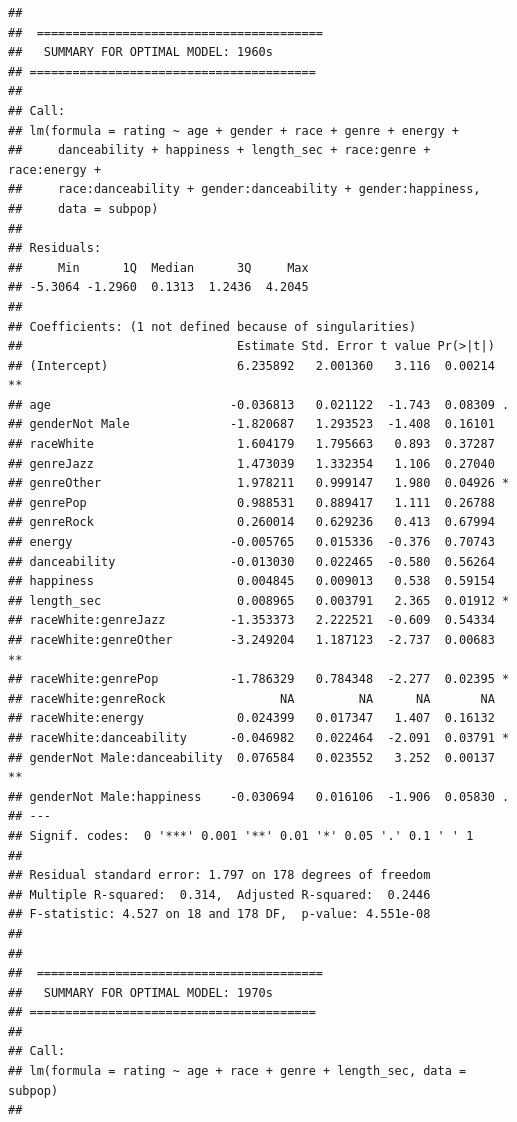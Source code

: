 \documentclass[
]{article}
\begin{document}
\begin{verbatim}
## 
##  ======================================== 
##   SUMMARY FOR OPTIMAL MODEL: 1960s 
## ======================================== 
## 
## Call:
## lm(formula = rating ~ age + gender + race + genre + energy + 
##     danceability + happiness + length_sec + race:genre + race:energy + 
##     race:danceability + gender:danceability + gender:happiness, 
##     data = subpop)
## 
## Residuals:
##     Min      1Q  Median      3Q     Max 
## -5.3064 -1.2960  0.1313  1.2436  4.2045 
## 
## Coefficients: (1 not defined because of singularities)
##                              Estimate Std. Error t value Pr(>|t|)   
## (Intercept)                  6.235892   2.001360   3.116  0.00214 **
## age                         -0.036813   0.021122  -1.743  0.08309 . 
## genderNot Male              -1.820687   1.293523  -1.408  0.16101   
## raceWhite                    1.604179   1.795663   0.893  0.37287   
## genreJazz                    1.473039   1.332354   1.106  0.27040   
## genreOther                   1.978211   0.999147   1.980  0.04926 * 
## genrePop                     0.988531   0.889417   1.111  0.26788   
## genreRock                    0.260014   0.629236   0.413  0.67994   
## energy                      -0.005765   0.015336  -0.376  0.70743   
## danceability                -0.013030   0.022465  -0.580  0.56264   
## happiness                    0.004845   0.009013   0.538  0.59154   
## length_sec                   0.008965   0.003791   2.365  0.01912 * 
## raceWhite:genreJazz         -1.353373   2.222521  -0.609  0.54334   
## raceWhite:genreOther        -3.249204   1.187123  -2.737  0.00683 **
## raceWhite:genrePop          -1.786329   0.784348  -2.277  0.02395 * 
## raceWhite:genreRock                NA         NA      NA       NA   
## raceWhite:energy             0.024399   0.017347   1.407  0.16132   
## raceWhite:danceability      -0.046982   0.022464  -2.091  0.03791 * 
## genderNot Male:danceability  0.076584   0.023552   3.252  0.00137 **
## genderNot Male:happiness    -0.030694   0.016106  -1.906  0.05830 . 
## ---
## Signif. codes:  0 '***' 0.001 '**' 0.01 '*' 0.05 '.' 0.1 ' ' 1
## 
## Residual standard error: 1.797 on 178 degrees of freedom
## Multiple R-squared:  0.314,  Adjusted R-squared:  0.2446 
## F-statistic: 4.527 on 18 and 178 DF,  p-value: 4.551e-08
## 
## 
##  ======================================== 
##   SUMMARY FOR OPTIMAL MODEL: 1970s 
## ======================================== 
## 
## Call:
## lm(formula = rating ~ age + race + genre + length_sec, data = subpop)
## 

\end{verbatim}
\end{document}
